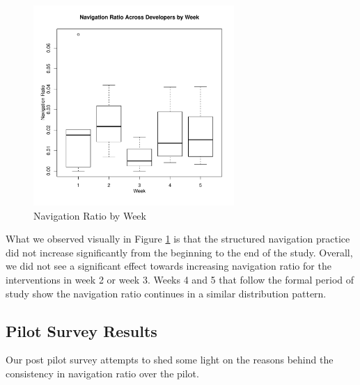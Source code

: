 \documentclass{sig-alternate}
\begin{document}
\begin{figure}\begin{mdframed}[linecolor=white]
	\includegraphics[width=3in]{navratioboxplot.pdf}
	\caption{Navigation Ratio by Week}
	\label{fig:navigationaverage}
\end{mdframed}\end{figure}

What we observed visually in Figure \ref{fig:navigationaverage} is that the structured navigation practice did not increase significantly from the beginning to the end of the study.  Overall, we did not see a significant effect towards increasing navigation ratio for the interventions in week 2 or week 3.   Weeks 4 and 5 that follow the formal period of study show the navigation ratio continues in a similar distribution pattern.

\subsection{Pilot Survey Results}

Our post pilot survey attempts to shed some light on the reasons behind the consistency in navigation ratio over the pilot.    
\end{document}
